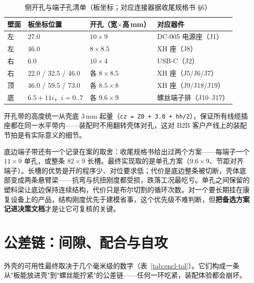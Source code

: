 \begin{table}[htbp]
  \centering
  \caption{侧开孔与端子孔清单（板坐标；对应连接器据收尾规格书 \S6）}
  \label{tab:encl-cuts}
  \begin{tabular}{llp{3.0cm}l}
    \toprule
    壁面 & 板坐标位置 & 开孔（宽$\times$高\,mm） & 对应器件 \\
    \midrule
    左 & 27.0 & $10\times9$ & DC-005 电源座（J1） \\
    左 & 46.0 & $8\times8.5$ & XH 座（J8） \\
    右 & 6.0 & $10\times4$ & USB-C（J2） \\
    右 & 22.0 / 32.5 / 46.0 & 各 $8\times8.5$ & XH 座（J5/J6/J7） \\
    顶 & 46.0 / 59.5 / 73.0 & 各 $8.5\times8$ & XH 座（J9/J18/J19） \\
    底 & $6.5+11i$，$i=0..7$ & 各 $9.6\times9$ & 螺丝端子排（J10--J17） \\
    \bottomrule
  \end{tabular}
\end{table}

开孔带的高度统一从壳底 3\,mm 起量（\texttt{cz = Z0 + 3.0 + hh/2}），保证所有线缆插座都在同一水平带内——装配时不用翻转壳体对孔，这对 B2B 客户产线上的装配节拍是有实际意义的细节。

底边端子带还有一个记录在案的取舍：收尾规格书给出过两个方案——每端子一个 $11\times9$ 单孔，或整条 $82\times9$ 长槽。最终实现取的是单孔方案（$9.6\times9$、节距对齐端子）。长槽的优势是开的程序少、对位要求低；代价是底边整条被切断，壳体底部变成两条悬臂梁——抗弯与抗扭刚度都受损，跌落工况最吃亏。单孔之间保留的塑料梁让底边保持连续结构，代价只是布尔切割的循环次数。对一个要长期挂在康复设备上的产品，结构刚度优先于建模省事，这个优先级不难判断，但\textbf{把备选方案记进决策文档}才是让它可复核的关键。

\section{公差链：间隙、配合与自攻}
\label{sec:encl-tol}

外壳的可用性最终取决于几个毫米级的数字（表~\ref{tab:encl-tol}）。它们构成一条从"板能放进壳"到"螺丝能拧紧"的公差链——任何一环吃紧，装配体验都会崩坏。

